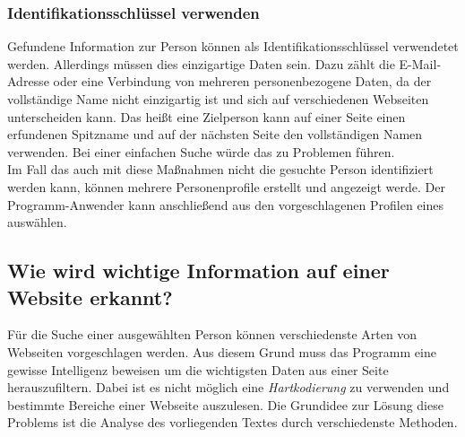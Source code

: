 		\subsubsection{Identifikationsschlüssel verwenden}
		Gefundene Information zur Person können als Identifikationsschlüssel verwendetet werden. Allerdings müssen dies einzigartige Daten sein. Dazu zählt die E-Mail-Adresse oder eine Verbindung von mehreren personenbezogene Daten, da der vollständige Name nicht einzigartig ist und sich auf verschiedenen Webseiten unterscheiden kann. Das heißt eine Zielperson kann auf einer Seite einen erfundenen Spitzname und auf der nächsten Seite den vollständigen Namen verwenden. Bei einer einfachen Suche würde das zu Problemen führen.\\
		
		Im Fall das auch mit diese Maßnahmen nicht die gesuchte Person identifiziert werden kann, können mehrere Personenprofile erstellt und angezeigt werde. Der Programm-Anwender kann anschließend aus den vorgeschlagenen Profilen eines auswählen.  
		
	\subsection{Wie wird wichtige Information auf einer Website erkannt?}
	
	Für die Suche einer ausgewählten Person können verschiedenste Arten von Webseiten vorgeschlagen werden. Aus diesem Grund muss das Programm eine gewisse Intelligenz beweisen um die wichtigsten Daten aus einer Seite herauszufiltern. Dabei ist es nicht möglich eine \textit{Hartkodierung} zu verwenden und bestimmte Bereiche einer Webseite auszulesen. Die Grundidee zur Lösung diese Problems ist die Analyse des vorliegenden Textes durch verschiedenste Methoden.
